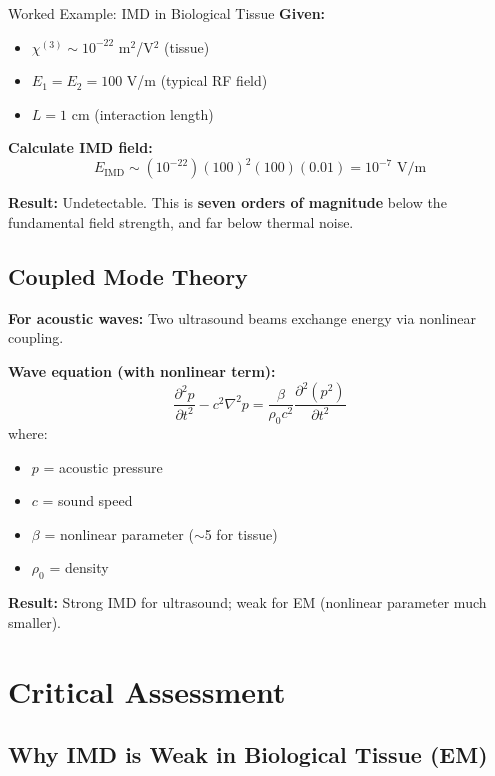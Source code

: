 \begin{calloutbox}{Worked Example: IMD in Biological Tissue}
\textbf{Given:}
\begin{itemize}
\item $\chi^{(3)} \sim 10^{-22}$ m$^2$/V$^2$ (tissue)
\item $E_1 = E_2 = 100$ V/m (typical RF field)
\item $L = 1$ cm (interaction length)
\end{itemize}

\textbf{Calculate IMD field:}
\begin{equation}
E_{\text{IMD}} \sim (10^{-22})(100)^2(100)(0.01) = 10^{-7} \text{ V/m}
\end{equation}

\textbf{Result:} Undetectable. This is \textbf{seven orders of magnitude} below the fundamental field strength, and far below thermal noise.
\end{calloutbox}

\subsection{Coupled Mode Theory}

\textbf{For acoustic waves:} Two ultrasound beams exchange energy via nonlinear coupling.

\textbf{Wave equation (with nonlinear term):}
\begin{equation}
\label{eq:nonlinear-wave-equation}
\frac{\partial^2 p}{\partial t^2} - c^2 \nabla^2 p = \frac{\beta}{\rho_0 c^2} \frac{\partial^2 (p^2)}{\partial t^2}
\end{equation}
where:
\begin{itemize}
\item $p$ = acoustic pressure
\item $c$ = sound speed
\item $\beta$ = nonlinear parameter ($\sim$5 for tissue)
\item $\rho_0$ = density
\end{itemize}

\textbf{Result:} Strong IMD for ultrasound; weak for EM (nonlinear parameter much smaller).

\section{Critical Assessment}

\subsection{Why IMD is Weak in Biological Tissue (EM)}

